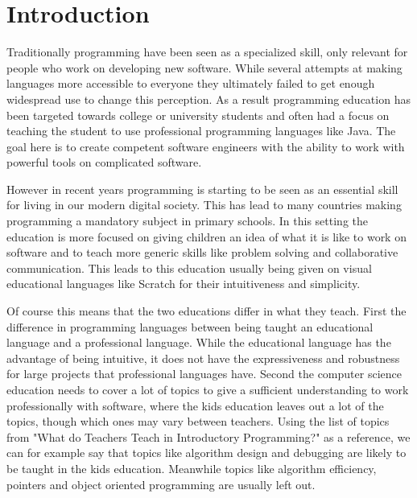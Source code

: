 \chapter{Introduction}
\label{chap:introduction}
Traditionally programming have been seen as a specialized skill, only relevant for people who work on developing new software.
While several attempts at making languages more accessible to everyone  they ultimately failed to get enough widespread use to change this perception.
As a result programming education has been targeted towards college or university students and often had a focus on teaching the student to use professional programming languages like Java.
The goal here is to create competent software engineers with the ability to work with powerful tools on complicated software.

However in recent years programming is starting to be seen as an essential skill for living in our modern digital society.
This has lead to many countries making programming a mandatory subject in primary schools.
In this setting the education is more focused on giving children an idea of what it is like to work on software and to teach more generic skills like problem solving and collaborative communication. This leads to this education usually being given on visual educational languages like Scratch for their intuitiveness and simplicity.

Of course this means that the two educations differ in what they teach.
First the difference in programming languages between being taught an educational language and a professional language. While the educational language has the advantage of being intuitive, it does not have the expressiveness and robustness for large projects that professional languages have.
Second the computer science education needs to cover a lot of topics to give a sufficient understanding to work professionally with software, where the kids education leaves out a lot of the topics, though which ones may vary between teachers.
Using the list of topics from "What do Teachers Teach in Introductory Programming?"\cite{WhatDoTeach06} as a reference, we can for example say that topics like algorithm design and debugging are likely to be taught in the kids education. Meanwhile topics like algorithm efficiency, pointers and object oriented programming are usually left out.


